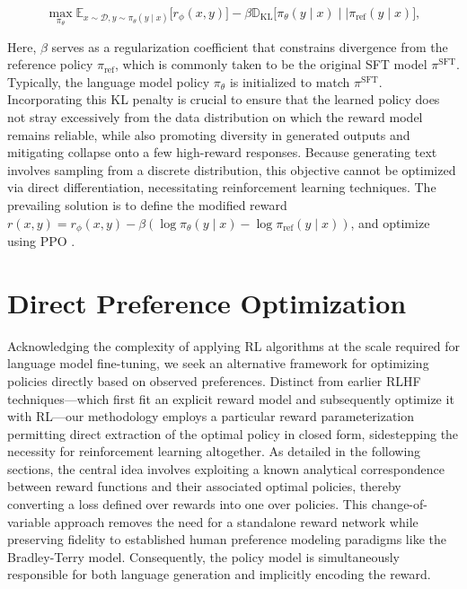 \begin{equation}\label{eq:RL}
\max_{\pi_{\theta}}  \mathbb{E}_{x\sim \mathcal{D}, y\sim \pi_{\theta}(y \mid x)}\bigl[r_{\phi}(x, y)\bigr] - \beta\mathbb{D}_{\textrm{KL}}\bigl[\pi_{\theta}(y\mid x)\mid \mid \pi_\text{ref}(y\mid x)\bigr],
\end{equation}

Here, $\beta$ serves as a regularization coefficient that constrains divergence from the reference policy $\pi_\text{ref}$, which is commonly taken to be the original SFT model $\pi^\text{SFT}$. 
Typically, the language model policy $\pi_\theta$ is initialized to match $\pi^\text{SFT}$. Incorporating this KL penalty is crucial to ensure that the learned policy does not stray excessively from the data distribution on which the reward model remains reliable, while also promoting diversity in generated outputs and mitigating collapse onto a few high-reward responses. Because generating text involves sampling from a discrete distribution, this objective cannot be optimized via direct differentiation, necessitating reinforcement learning techniques. The prevailing solution \citep{ziegler2020finetuning, stiennon2022learning, bai2022training, ouyang2022training} is to define the modified reward ${r(x, y) = r_{\phi}(x, y) -\beta (\log \pi_{\theta}(y\mid x) - \log \pi_\text{ref}(y\mid x))}$, and optimize using PPO \cite{schulman2017proximal}.

\section{Direct Preference Optimization}\label{sec:DPO}

Acknowledging the complexity of applying RL algorithms at the scale required for language model fine-tuning, we seek an alternative framework for optimizing policies directly based on observed preferences. Distinct from earlier RLHF techniques—which first fit an explicit reward model and subsequently optimize it with RL—our methodology employs a particular reward parameterization permitting direct extraction of the optimal policy in closed form, sidestepping the necessity for reinforcement learning altogether. As detailed in the following sections, the central idea involves exploiting a known analytical correspondence between reward functions and their associated optimal policies, thereby converting a loss defined over rewards into one over policies. This change-of-variable approach removes the need for a standalone reward network while preserving fidelity to established human preference modeling paradigms like the Bradley-Terry model. Consequently, the policy model is simultaneously responsible for both language generation and implicitly encoding the reward.

